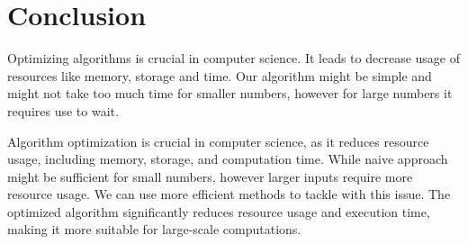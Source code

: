 \documentclass[a4paper,11pt]{article}
\begin{document}
\section{Conclusion}
Optimizing algorithms is crucial in computer science. It leads to decrease usage of resources like memory, storage and time. Our algorithm might be simple and might not take too much time for smaller numbers, however for large numbers it requires use to wait.

Algorithm optimization is crucial in computer science, as it reduces resource usage, including memory, storage, and computation time. While naive approach might be sufficient for small numbers, however larger inputs require more resource usage. We can use more efficient methods to tackle with this issue. The optimized algorithm significantly reduces resource usage and execution time, making it more suitable for large-scale computations.
\end{document}
